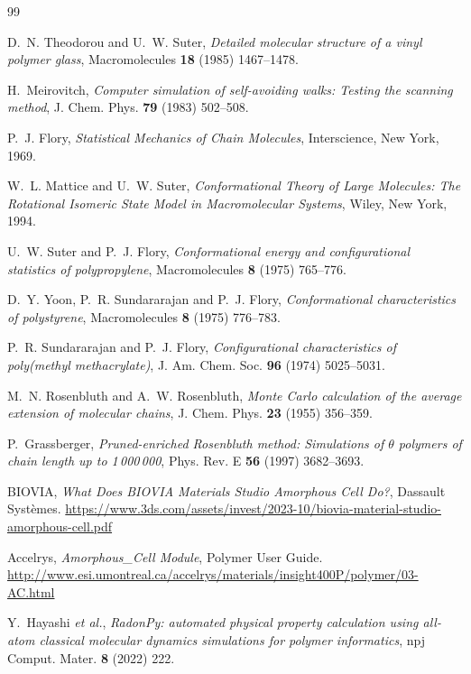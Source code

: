 \documentclass[11pt,a4paper]{article}
\begin{document}
\begin{thebibliography}{99}
\small

D.~N. Theodorou and U.~W. Suter,
\emph{Detailed molecular structure of a vinyl polymer glass},
Macromolecules \textbf{18} (1985) 1467--1478.

H.~Meirovitch,
\emph{Computer simulation of self-avoiding walks: Testing the scanning method},
J. Chem. Phys. \textbf{79} (1983) 502--508.

P.~J. Flory,
\emph{Statistical Mechanics of Chain Molecules},
Interscience, New York, 1969.

W.~L. Mattice and U.~W. Suter,
\emph{Conformational Theory of Large Molecules: The Rotational Isomeric State
Model in Macromolecular Systems},
Wiley, New York, 1994.

U.~W. Suter and P.~J. Flory,
\emph{Conformational energy and configurational statistics of polypropylene},
Macromolecules \textbf{8} (1975) 765--776.

D.~Y. Yoon, P.~R. Sundararajan and P.~J. Flory,
\emph{Conformational characteristics of polystyrene},
Macromolecules \textbf{8} (1975) 776--783.

P.~R. Sundararajan and P.~J. Flory,
\emph{Configurational characteristics of poly(methyl methacrylate)},
J. Am. Chem. Soc. \textbf{96} (1974) 5025--5031.

M.~N. Rosenbluth and A.~W. Rosenbluth,
\emph{Monte Carlo calculation of the average extension of molecular chains},
J. Chem. Phys. \textbf{23} (1955) 356--359.

P.~Grassberger,
\emph{Pruned-enriched Rosenbluth method: Simulations of $\theta$ polymers of
chain length up to 1\,000\,000},
Phys. Rev. E \textbf{56} (1997) 3682--3693.

BIOVIA,
\emph{What Does BIOVIA Materials Studio Amorphous Cell Do?},
Dassault Syst\`emes.
\url{https://www.3ds.com/assets/invest/2023-10/biovia-material-studio-amorphous-cell.pdf}

Accelrys,
\emph{Amorphous\_Cell Module}, Polymer User Guide.
\url{http://www.esi.umontreal.ca/accelrys/materials/insight400P/polymer/03-AC.html}

Y.~Hayashi \emph{et al.},
\emph{RadonPy: automated physical property calculation using all-atom
classical molecular dynamics simulations for polymer informatics},
npj Comput. Mater. \textbf{8} (2022) 222.


\end{thebibliography}
\end{document}

